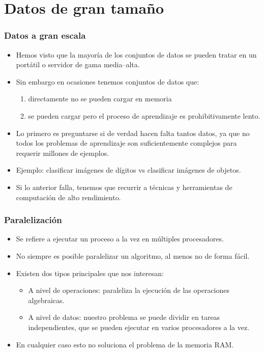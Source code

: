 \documentclass{beamer}
\begin{document}
\section{Datos de gran tamaño}

\begin{frame}
\frametitle{Datos a gran escala}

\begin{itemize}
\item Hemos visto que la mayoría de los conjuntos de datos se pueden tratar en un portátil o servidor de gama media--alta.
\item Sin embargo en ocasiones tenemos conjuntos de datos que:
\begin{enumerate}
\item directamente no se pueden cargar en memoria
\item se pueden cargar pero el proceso de aprendizaje es prohibitivamente lento.
\end{enumerate}
\item Lo primero es preguntarse si de verdad hacen falta tantos datos, ya que no todos los problemas de aprendizaje son suficientemente complejos para requerir millones de ejemplos.
\item Ejemplo: clasificar imágenes de dígitos vs clasificar imágenes de objetos.
\item Si lo anterior falla, tenemos que recurrir a técnicas y herramientas de computación de alto rendimiento.
\end{itemize}
\end{frame}

\begin{frame}
\frametitle{Paralelización}

\begin{itemize}
\item Se refiere a ejecutar un proceso a la vez en múltiples procesadores.
\item No siempre es posible paralelizar un algoritmo, al menos no de forma fácil.
\item Existen dos tipos principales que nos interesan:
\begin{itemize}
\item A nivel de operaciones: paraleliza la ejecución de las operaciones algebraicas.
\item A nivel de datos: nuestro problema se puede dividir en tareas independientes, que se pueden ejecutar en varios procesadores a la vez.
\end{itemize}
\item En cualquier caso esto no soluciona el problema de la memoria RAM.
\end{itemize}
\end{frame}
\end{document}
